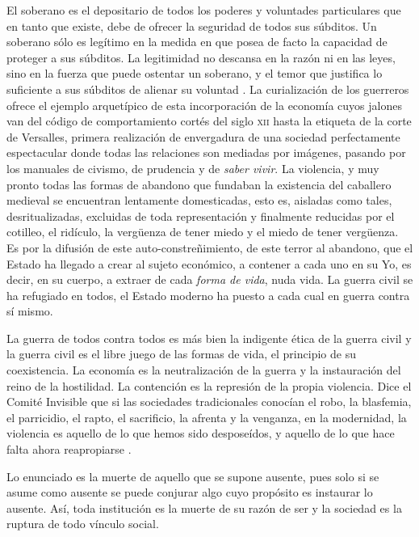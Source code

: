 El soberano es el depositario de todos los poderes y voluntades particulares que en tanto que existe, debe de ofrecer la seguridad de todos sus súbditos. Un soberano sólo es legítimo en la medida en que posea de facto la capacidad de proteger a sus súbditos. La legitimidad no descansa en la razón ni en las leyes, sino en la fuerza que puede ostentar un soberano, y el temor que justifica lo suficiente a sus súbditos de alienar su voluntad \autocite[p.~39]{tiqqunIntroduccionGuerraCivil2008}. La curialización de los guerreros ofrece el ejemplo arquetípico de esta incorporación de la economía cuyos jalones van del código de comportamiento cortés del siglo \textsc{xii} hasta la etiqueta de la corte de Versalles, primera realización de envergadura de una sociedad perfectamente espectacular donde todas las relaciones son mediadas por imágenes, pasando por los manuales de civismo, de prudencia y de \emph{saber vivir}. La violencia, y muy pronto todas las formas de abandono que fundaban la existencia del caballero medieval se encuentran lentamente domesticadas, esto es, aisladas como tales, desritualizadas, excluidas de toda representación y finalmente reducidas por el cotilleo, el ridículo, la vergüenza de tener miedo y el miedo de tener vergüenza. Es por la difusión de este auto-constreñimiento, de este terror al abandono, que el Estado ha llegado a crear al sujeto económico, a contener a cada uno en su Yo, es decir, en su cuerpo, a extraer de cada \emph{forma de vida}, nuda vida. La guerra civil se ha refugiado en todos, el Estado moderno ha puesto a cada cual en guerra contra sí mismo.

La guerra de todos contra todos es más bien la indigente ética de la guerra civil y la guerra civil es el libre juego de las formas de vida, el principio de su coexistencia. La economía es la neutralización de la guerra y la instauración del reino de la hostilidad. La contención es la represión de la propia violencia. Dice el Comité Invisible que si las sociedades tradicionales conocían el robo, la blasfemia, el parricidio, el rapto, el sacrificio, la afrenta y la venganza, en la modernidad, la violencia es aquello de lo que hemos sido desposeídos, y aquello de lo que hace falta ahora reapropiarse \autocite{tiqqunIntroduccionGuerraCivil2008}.

Lo enunciado es la muerte de aquello que se supone ausente, pues solo si se asume como ausente se puede conjurar algo cuyo propósito es instaurar lo ausente. Así, toda institución es la muerte de su razón de ser y la sociedad es la ruptura de todo vínculo social.

